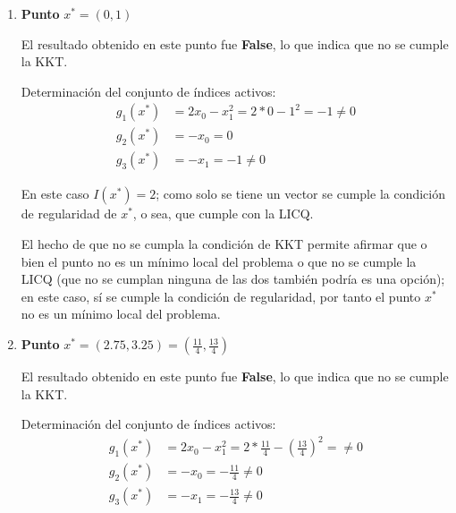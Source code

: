 \documentclass[titlepage, 11pt]{scrartcl}
\begin{document}
\begin{enumerate}
\begin{enumerate}
\begin{enumerate}
			Por tanto $I(x^*)  = \emptyset$, lo cual implica que se cumple la condici\'on de regularidad de $x^*$, o sea, que cumple con la LICQ.
			
			El hecho de que no se cumpla la condición de KKT permite afirmar que o bien el punto no es un m\'inimo local del problema o que no se cumple la LICQ (que no se cumplan ninguna de las dos también podría es una opci\'on); en este caso, s\'i se cumple la condici\'on de regularidad, por tanto el punto $x^*$ no es un m\'inimo local del problema.
			
			\vspace{7mm}
			\item \textbf{Punto} $x^* = (0, 1)$
			
			El resultado obtenido en este punto fue \textbf{False}, lo que indica que no se cumple la KKT.
			
			Determinaci\'on del conjunto de \'indices activos:
			\begin{align*}
			g_1(x^*) &= 2x_0 - x_1^2 = 2 * 0 - 1^2 = -1 \neq 0\\
			g_2(x^*) &= -x_0 = 0\\
			g_3(x^*) &= -x_1 = -1 \neq 0
			\end{align*}
			
			En este caso $I(x^*)  = {2}$; como solo se tiene un vector se cumple la condici\'on de regularidad de $x^*$, o sea, que cumple con la LICQ.
			
			El hecho de que no se cumpla la condición de KKT permite afirmar que o bien el punto no es un m\'inimo local del problema o que no se cumple la LICQ (que no se cumplan ninguna de las dos también podría es una opci\'on); en este caso, s\'i se cumple la condici\'on de regularidad, por tanto el punto $x^*$ no es un m\'inimo local del problema.
			
			\vspace{7mm}
			\item \textbf{Punto} $x^* = (2.75, 3.25) = (\frac{11}{4}, \frac{13}{4})$
			
			El resultado obtenido en este punto fue \textbf{False}, lo que indica que no se cumple la KKT.
			
			Determinaci\'on del conjunto de \'indices activos:
			\begin{align*}
			g_1(x^*) &= 2x_0 - x_1^2 = 2 * \frac{11}{4} - (\frac{13}{4})^2 = \neq 0\\
			g_2(x^*) &= -x_0 = -\frac{11}{4} \neq 0\\
			g_3(x^*) &= -x_1 = -\frac{13}{4} \neq 0
			\end{align*}
			

\end{enumerate}
\end{enumerate}
\end{enumerate}
\end{document}
